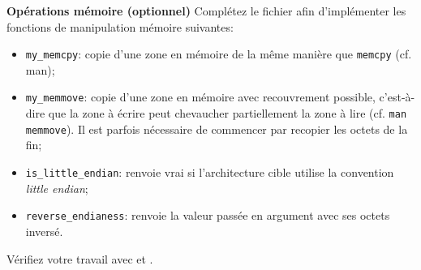 \documentclass[10pt]{article}\usepackage[enonce]{exemptty}
\begin{document}
\begin{Exercice}\textbf{Opérations mémoire (optionnel)}
Complétez le fichier  afin d'implémenter les fonctions de manipulation mémoire suivantes:
\begin{itemize}
\item \texttt{my\_memcpy}: copie d'une zone en mémoire de la même manière que
  \texttt{memcpy} (cf. man);
\item \texttt{my\_memmove}: copie d'une zone en mémoire avec
  recouvrement possible, c'est-à-dire que la zone à écrire peut
  chevaucher partiellement la zone à lire (cf. \texttt{man
    memmove}). Il est parfois nécessaire de commencer par recopier les
  octets de la fin;
\item \texttt{is\_little\_endian}: renvoie vrai si l'architecture
  cible utilise la convention \textit{little endian};
\item \texttt{reverse\_endianess}: renvoie la valeur passée en
  argument avec ses octets inversé.
\end{itemize}
Vérifiez votre travail avec   et
.
\end{Exercice}
\end{document}
